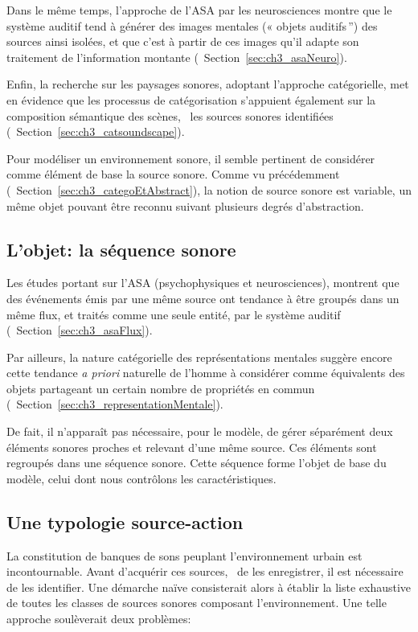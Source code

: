 Dans le même temps, l'approche de l'ASA par les neurosciences montre que le système auditif tend à générer des images mentales (« objets auditifs\,'') des sources ainsi isolées, et que c'est à partir de ces images qu'il adapte son traitement de l'information montante (\cf~Section~\ref{sec:ch3_asaNeuro}).

Enfin, la recherche sur les paysages sonores, adoptant l’approche catégorielle, met en évidence que les processus de catégorisation s'appuient également sur la composition sémantique des scènes, \ie~les sources sonores identifiées (\cf~Section~\ref{sec:ch3_catsoundscape}). 

Pour modéliser un environnement sonore, il semble pertinent de considérer comme élément de base la source sonore. Comme vu précédemment (\cf~Section~\ref{sec:ch3_categoEtAbstract}), la notion de source sonore est variable, un même objet pouvant être reconnu suivant plusieurs degrés d'abstraction.

\subsection{L'objet: la séquence sonore}

Les études portant sur l'ASA (psychophysiques et neurosciences), montrent que des événements émis par une même source ont tendance à être groupés dans un même flux, et traités comme une seule entité, par le système auditif (\cf~Section~\ref{sec:ch3_asaFlux}).

Par ailleurs, la nature catégorielle des représentations mentales suggère encore cette tendance \emph{a priori} naturelle de l'homme à considérer comme équivalents des objets partageant un certain nombre de propriétés en commun (\cf~Section~\ref{sec:ch3_representationMentale}).

De fait, il n'apparaît pas nécessaire, pour le modèle, de gérer séparément deux éléments sonores proches et relevant d'une même source. Ces éléments sont regroupés dans une séquence sonore. Cette séquence forme l'objet de base du modèle, celui dont nous contrôlons les caractéristiques. 

\subsection{Une typologie source-action}
\label{sec:ch4_sourceAction}

La constitution de banques de sons peuplant l'environnement urbain est incontournable. Avant d'acquérir ces sources, \ie~de les enregistrer, il est nécessaire de les identifier. Une démarche naïve consisterait alors à établir la liste exhaustive de toutes les classes de sources sonores composant l'environnement. Une telle approche soulèverait deux problèmes:

